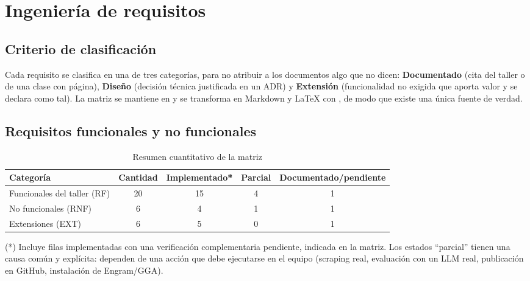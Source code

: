 \chapter{Ingeniería de requisitos}\label{cap:requisitos}

\section{Criterio de clasificación}
Cada requisito se clasifica en una de tres categorías, para no atribuir a los documentos algo que no dicen:
\textbf{Documentado} (cita del taller o de una clase con página), \textbf{Diseño} (decisión técnica
justificada en un ADR) y \textbf{Extensión} (funcionalidad no exigida que aporta valor y se declara como tal).
La matriz se mantiene en  y se transforma en Markdown y LaTeX con
, de modo que existe una única fuente de verdad.

\section{Requisitos funcionales y no funcionales}
\begin{table}[H]\centering\small
\caption{Resumen cuantitativo de la matriz}\label{tab:resumen-matriz}
\begin{tabular}{@{}lcccc@{}}\toprule
Categoría & Cantidad & Implementado* & Parcial & Documentado/pendiente\\\midrule
Funcionales del taller (RF) & 20 & 15 & 4 & 1\\
No funcionales (RNF) & 6 & 4 & 1 & 1\\
Extensiones (EXT) & 6 & 5 & 0 & 1\\\bottomrule
\end{tabular}
\end{table}
(*) Incluye filas implementadas con una verificación complementaria pendiente, indicada en la matriz. Los estados ``parcial'' tienen una causa común y explícita: dependen de una acción que debe ejecutarse en el
equipo  (scraping real, evaluación con un LLM real, publicación en GitHub, instalación de Engram/GGA).

